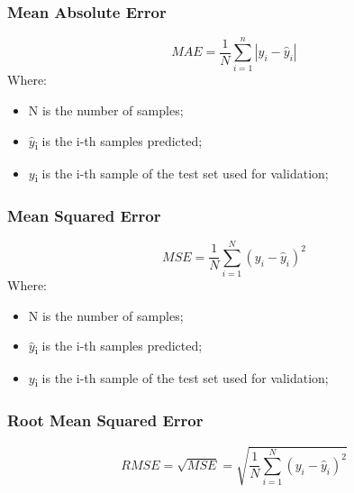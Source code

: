 \subsubsection{Mean Absolute Error}
\begin{equation}
MAE = \frac{1}{N}\sum_{i=1}^{n}|y_i-\hat{y}_i|
\end{equation}
Where:
\begin{itemize}
    \item N is the number of samples;
    \item $\hat{y}$\textsubscript{i} is the i-th samples predicted;
    \item $y$\textsubscript{i} is the i-th sample of the test set used for validation;
\end{itemize}
\pagebreak
\subsubsection{Mean Squared Error}
\begin{equation}
MSE = \frac{1}{N}\sum_{i=1}^{N}(y_i-\hat{y}_i)^2
\end{equation}
Where:
\begin{itemize}
    \item N is the number of samples;
    \item $\hat{y}$\textsubscript{i} is the i-th samples predicted;
    \item $y$\textsubscript{i} is the i-th sample of the test set used for validation;
\end{itemize}
\subsubsection{Root Mean Squared Error}
\begin{equation}
RMSE = \sqrt{MSE}= \sqrt{\frac{1}{N}\sum_{i=1}^{N}(y_i-\hat{y}_i)^2}
\end{equation}
